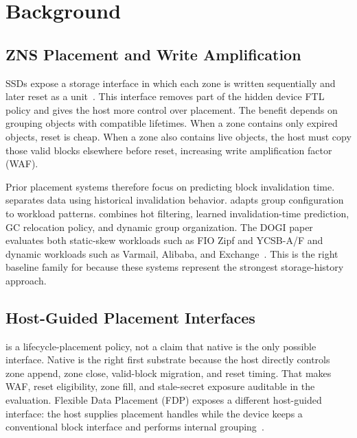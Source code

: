 \section{Background}
\suppressfloats[t]

\subsection{ZNS Placement and Write Amplification}

\zns SSDs expose a storage interface in which each zone is written sequentially and later reset as a unit~\cite{zns}.  This interface removes part of the hidden device FTL policy and gives the host more control over placement.  The benefit depends on grouping objects with compatible lifetimes.  When a zone contains only expired objects, reset is cheap.  When a zone also contains live objects, the host must copy those valid blocks elsewhere before reset, increasing write amplification factor (WAF).

Prior placement systems therefore focus on predicting block invalidation time.  \sepbit separates data using historical invalidation behavior.  \midas adapts group configuration to workload patterns.  \dogi combines hot filtering, learned invalidation-time prediction, GC relocation policy, and dynamic group organization.  The DOGI paper evaluates both static-skew workloads such as FIO Zipf and YCSB-A/F and dynamic workloads such as Varmail, Alibaba, and Exchange~\cite{dogi}.  This is the right baseline family for \system because these systems represent the strongest storage-history approach.

\subsection{Host-Guided Placement Interfaces}

\system is a lifecycle-placement policy, not a claim that native \zns is the only possible interface.  Native \zns is the right first substrate because the host directly controls zone append, zone close, valid-block migration, and reset timing.  That makes WAF, reset eligibility, zone fill, and stale-secret exposure auditable in the evaluation.  Flexible Data Placement (FDP) exposes a different host-guided interface: the host supplies placement handles while the device keeps a conventional block interface and performs internal grouping~\cite{fdp}.

